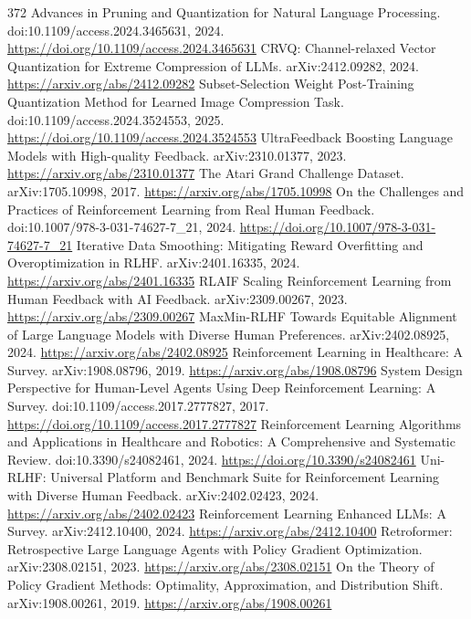 \documentclass[11pt]{article}
\begin{document}
\begin{thebibliography}{372}
 Advances in Pruning and Quantization for Natural Language Processing. doi:10.1109/access.2024.3465631, 2024. \url{https://doi.org/10.1109/access.2024.3465631}
 CRVQ: Channel-relaxed Vector Quantization for Extreme Compression of LLMs. arXiv:2412.09282, 2024. \url{https://arxiv.org/abs/2412.09282}
 Subset-Selection Weight Post-Training Quantization Method for Learned Image Compression Task. doi:10.1109/access.2024.3524553, 2025. \url{https://doi.org/10.1109/access.2024.3524553}
 UltraFeedback Boosting Language Models with High-quality Feedback. arXiv:2310.01377, 2023. \url{https://arxiv.org/abs/2310.01377}
 The Atari Grand Challenge Dataset. arXiv:1705.10998, 2017. \url{https://arxiv.org/abs/1705.10998}
 On the Challenges and Practices of Reinforcement Learning from Real Human Feedback. doi:10.1007/978-3-031-74627-7\_21, 2024. \url{https://doi.org/10.1007/978-3-031-74627-7_21}
 Iterative Data Smoothing: Mitigating Reward Overfitting and Overoptimization in RLHF. arXiv:2401.16335, 2024. \url{https://arxiv.org/abs/2401.16335}
 RLAIF Scaling Reinforcement Learning from Human Feedback with AI Feedback. arXiv:2309.00267, 2023. \url{https://arxiv.org/abs/2309.00267}
 MaxMin-RLHF Towards Equitable Alignment of Large Language Models with Diverse Human Preferences. arXiv:2402.08925, 2024. \url{https://arxiv.org/abs/2402.08925}
 Reinforcement Learning in Healthcare: A Survey. arXiv:1908.08796, 2019. \url{https://arxiv.org/abs/1908.08796}
 System Design Perspective for Human-Level Agents Using Deep Reinforcement Learning: A Survey. doi:10.1109/access.2017.2777827, 2017. \url{https://doi.org/10.1109/access.2017.2777827}
 Reinforcement Learning Algorithms and Applications in Healthcare and Robotics: A Comprehensive and Systematic Review. doi:10.3390/s24082461, 2024. \url{https://doi.org/10.3390/s24082461}
 Uni-RLHF: Universal Platform and Benchmark Suite for Reinforcement Learning with Diverse Human Feedback. arXiv:2402.02423, 2024. \url{https://arxiv.org/abs/2402.02423}
 Reinforcement Learning Enhanced LLMs: A Survey. arXiv:2412.10400, 2024. \url{https://arxiv.org/abs/2412.10400}
 Retroformer: Retrospective Large Language Agents with Policy Gradient Optimization. arXiv:2308.02151, 2023. \url{https://arxiv.org/abs/2308.02151}
 On the Theory of Policy Gradient Methods: Optimality, Approximation, and Distribution Shift. arXiv:1908.00261, 2019. \url{https://arxiv.org/abs/1908.00261}

\end{thebibliography}
\end{document}

